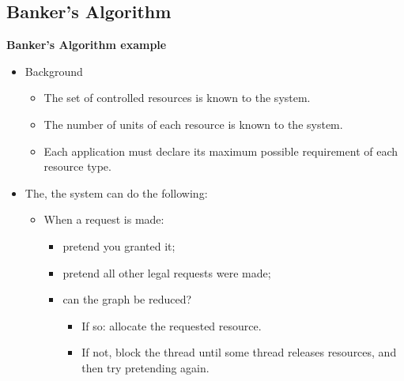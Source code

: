 \documentclass[11pt,a4paper]{article}
\begin{document}
\subsection{Banker's Algorithm}

\textbf{Banker's Algorithm example}
\begin{itemize}
    \item Background
        \begin{itemize}
            \item The set of controlled resources is known to the system.
            \item The number of units of each resource is known to the system.
            \item Each application must declare its maximum possible requirement of each
                resource type.
        \end{itemize}
    \item The, the system can do the following:
        \begin{itemize}
            \item When a request is made:
                \begin{itemize}
                    \item pretend you granted it;
                    \item pretend all other legal requests were made;
                    \item can the graph be reduced?
                        \begin{itemize}
                            \item If so: allocate the requested resource.
                            \item If not, block the thread until some thread releases
                                resources, and then try pretending again.
                        \end{itemize}
                \end{itemize}
        \end{itemize}
\end{itemize}
\end{document}
